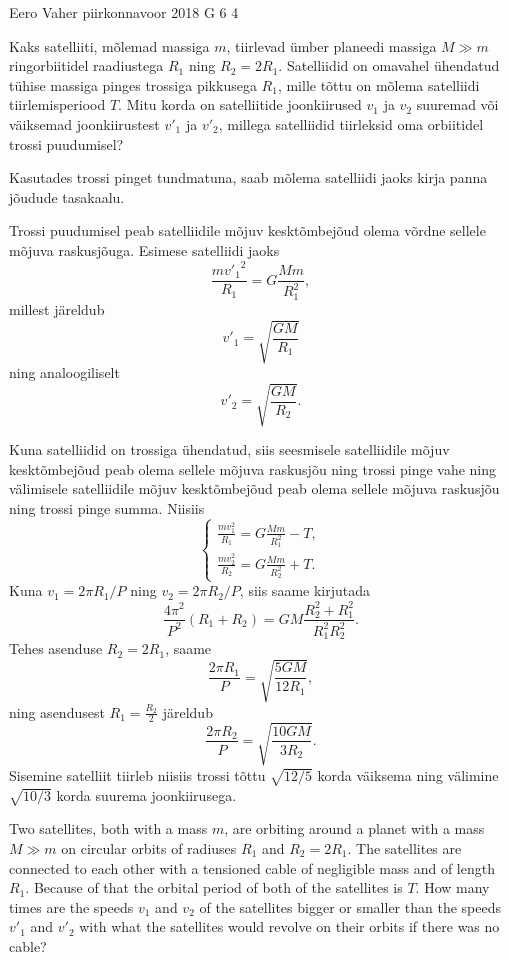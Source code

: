 {Eero Vaher} %
{piirkonnavoor} %
{2018} %
{G 6} %
{4} %
{
\ifStatement
Kaks satelliiti, mõlemad massiga $m$, tiirlevad ümber planeedi massiga $M\gg m$ ringorbiitidel raadiustega $R_1$ ning $R_2=2R_1$. Satelliidid on omavahel ühendatud tühise massiga pinges trossiga pikkusega $R_1$, mille tõttu on mõlema satelliidi tiirlemisperiood $T$. Mitu korda on satelliitide joonkiirused $v_1$ ja $v_2$ suuremad või väiksemad joonkiirustest $v'_1$ ja $v'_2$, millega satelliidid tiirleksid oma orbiitidel trossi puudumisel?
\fi


\ifHint
Kasutades trossi pinget tundmatuna, saab mõlema satelliidi jaoks kirja panna jõudude tasakaalu.
\fi


\ifSolution
Trossi puudumisel peab satelliidile mõjuv kesktõmbejõud olema võrdne sellele mõjuva raskusjõuga. Esimese satelliidi jaoks
\[
\frac{{mv'_1}^2}{R_1}=G\frac{Mm}{R_1^2},
\]
millest järeldub
\[
v'_1=\sqrt{\frac{GM}{R_1}}
\]
ning analoogiliselt
\[
v'_2=\sqrt{\frac{GM}{R_2}}.
\]

Kuna satelliidid on trossiga ühendatud, siis seesmisele satelliidile mõjuv kesktõmbejõud peab olema sellele mõjuva raskusjõu ning trossi pinge vahe ning välimisele satelliidile mõjuv kesktõmbejõud peab olema sellele mõjuva raskusjõu ning trossi pinge summa. Niisiis
$$\begin{cases}
\frac{mv_1^2}{R_1}=G\frac{Mm}{R_1^2}-T,\\
\frac{mv_2^2}{R_2}=G\frac{Mm}{R_2^2}+T.
\end{cases}$$ 
Kuna $v_1=2\pi R_1/P$ ning $v_2=2\pi R_2/P$, siis saame kirjutada
$$\frac{4\pi^2}{P^2}\left(R_1+R_2\right)=GM\frac{R_2^2+R_1^2}{R_1^2R_2^2}.$$
Tehes asenduse $R_2=2R_1$, saame
\[
\frac{2\pi R_1}{P}=\sqrt{\frac{5GM}{12R_1}},
\]
ning asendusest $R_1=\frac{R_2}{2}$ järeldub
\[
\frac{2\pi R_2}{P}=\sqrt{\frac{10GM}{3R_2}}.
\]
Sisemine satelliit tiirleb niisiis trossi tõttu $\sqrt{12/5}$ korda väiksema ning välimine $\sqrt{10/3}$ korda suurema joonkiirusega.
\fi


\ifEngStatement
Two satellites, both with a mass $m$, are orbiting around a planet with a mass $M\gg m$ on circular orbits of radiuses $R_1$ and $R_2=2R_1$. The satellites are connected to each other with a tensioned cable of negligible mass and of length $R_1$. Because of that the orbital period of both of the satellites is $T$. How many times are the speeds $v_1$ and $v_2$ of the satellites bigger or smaller than the speeds $v'_1$ and $v'_2$ with what the satellites would revolve on their orbits if there was no cable?
\fi


}
